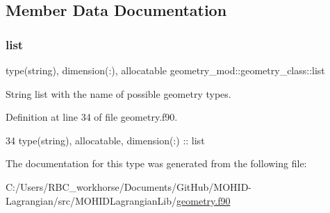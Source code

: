\subsection{Member Data Documentation}
\mbox{\label{structgeometry__mod_1_1geometry__class_a218ff308d9bb94f4386573d7329babc6}} 
\subsubsection{\texorpdfstring{list}{list}}
{\footnotesize\ttfamily type(string), dimension(\+:), allocatable geometry\+\_\+mod\+::geometry\+\_\+class\+::list\hspace{0.3cm}{\ttfamily [private]}}



String list with the name of possible geometry types. 



Definition at line 34 of file geometry.\+f90.


\begin{DoxyCode}
34         \textcolor{keywordtype}{type}(string), \textcolor{keywordtype}{allocatable}, \textcolor{keywordtype}{dimension(:)} :: list
\end{DoxyCode}


The documentation for this type was generated from the following file\+:\begin{DoxyCompactItemize}
\item 
C\+:/\+Users/\+R\+B\+C\+\_\+workhorse/\+Documents/\+Git\+Hub/\+M\+O\+H\+I\+D-\/\+Lagrangian/src/\+M\+O\+H\+I\+D\+Lagrangian\+Lib/\mbox{\hyperlink{geometry_8f90}{geometry.\+f90}}\end{DoxyCompactItemize}
